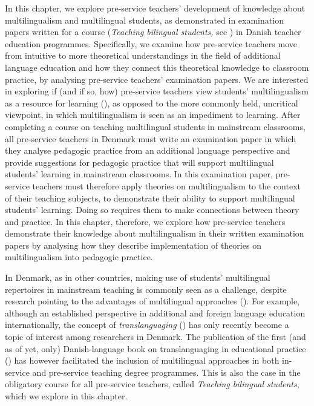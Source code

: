 \documentclass[output=paper]{langscibook}
\begin{document}
In this chapter, we explore pre-service teachers’ development of knowledge about multilingualism and multilingual students, as demonstrated in examination papers written for a course (\textit{Teaching bilingual students,} see ) in Danish teacher education programmes. Specifically, we examine how pre-service teachers move from intuitive to more theoretical understandings in the field of additional language education and how they connect this theoretical knowledge to classroom practice, by analysing pre-service teachers’ examination papers. We are interested in exploring if (and if so, how) pre-service teachers view students’ multilingualism as a resource for learning (\citealt{Garcia2017-1}), as opposed to the more commonly held, uncritical viewpoint, in which multilingualism is seen as an impediment to learning. After completing a course on teaching multilingual students in mainstream classrooms, all pre-service teachers in Denmark must write an examination paper in which they analyse pedagogic practice from an additional language perspective and provide suggestions for pedagogic practice that will support multilingual students’ learning in mainstream classrooms. In this examination paper, pre-service teachers must therefore apply theories on multilingualism to the context of their teaching subjects, to demonstrate their ability to support multilingual students’ learning. Doing so requires them to make connections between theory and practice. In this chapter, therefore, we explore how pre-service teachers demonstrate their knowledge about multilingualism in their written examination papers by analysing how they describe implementation of theories on multilingualism into pedagogic practice.

In Denmark, as in other countries, making use of students’ multilingual repertoires in mainstream teaching is commonly seen as a challenge, despite research pointing to the advantages of multilingual approaches (\citealt{Dewilde2020,Laursen2019,PaulsrudEtAl2017}).  For example, although an established perspective in additional and foreign language education internationally, the concept of \textit{translanguaging} (\citealt{Garcia2017-1})  has only recently become a topic of interest among researchers in Denmark. The publication of the first (and as of yet, only) Danish-language book on translanguaging in educational practice (\citealt{HolmenThise2021}) has however facilitated the inclusion of multilingual approaches in both in\hyp service and pre-service teaching degree programmes. This is also the case in the obligatory course for all pre-service teachers, called \textit{Teaching bilingual students}, which we explore in this chapter.
\end{document}
